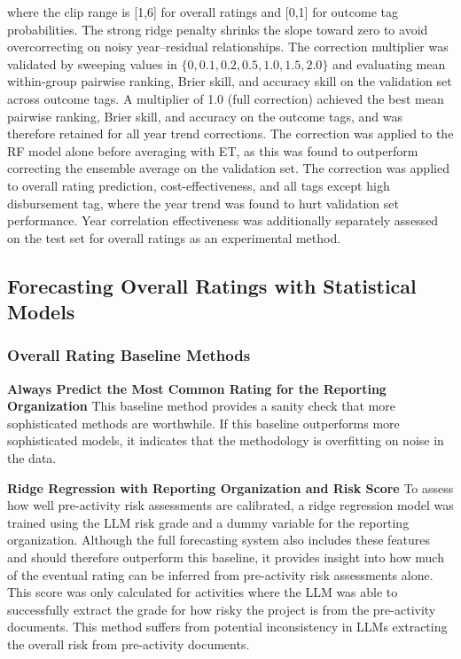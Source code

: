 \documentclass[12pt,a4paper]{article}
\begin{document}
where the clip range is [1,6] for overall ratings and [0,1] for outcome tag probabilities. The strong ridge penalty shrinks the slope toward zero to avoid overcorrecting on noisy year--residual relationships.
The correction multiplier was validated by sweeping values in $\{0, 0.1, 0.2, 0.5, 1.0, 1.5, 2.0\}$ and evaluating mean within-group pairwise ranking, Brier skill, and accuracy skill on the validation set across outcome tags. A multiplier of 1.0 (full correction) achieved the best mean pairwise ranking, Brier skill, and accuracy on the outcome tags, and was therefore retained for all year trend corrections. The correction was applied to the RF model alone before averaging with ET, as this was found to outperform correcting the ensemble average on the validation set. The correction was applied to overall rating prediction, cost-effectiveness, and all tags except high disbursement tag, where the year trend was found to hurt validation set performance. Year correlation effectiveness was additionally separately assessed on the test set for overall ratings as an experimental method.


\FloatBarrier
\subsection{Forecasting Overall Ratings with Statistical Models}
\subsubsection{Overall Rating Baseline Methods} \label{sub:baselines}

\textbf{Always Predict the Most Common Rating for the Reporting Organization}
This baseline method provides a sanity check that more sophisticated methods are worthwhile. If this baseline outperforms more sophisticated models, it indicates that the methodology is overfitting on noise in the data.

\textbf{Ridge Regression with Reporting Organization and Risk Score}
To assess how well pre-activity risk assessments are calibrated, a ridge regression model was trained using the LLM risk grade and a dummy variable for the reporting organization. Although the full forecasting system also includes these features and should therefore outperform this baseline, it provides insight into how much of the eventual rating can be inferred from pre-activity risk assessments alone. This score was only calculated for activities where the LLM was able to successfully extract the grade for how risky the project is from the pre-activity documents. This method suffers from potential inconsistency in LLMs extracting the overall risk from pre-activity documents.
\end{document}
